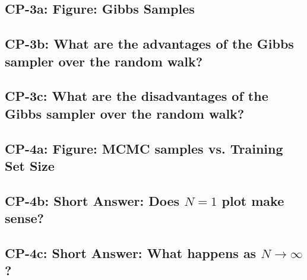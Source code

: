 \documentclass[10pt]{article}
\begin{document}
\newpage

\subsection{CP-3a: Figure: Gibbs Samples}

\subsection{CP-3b: What are the advantages of the Gibbs sampler over the random walk?}

\subsection{CP-3c: What are the disadvantages of the Gibbs sampler over the random walk?}

\newpage
\subsection{CP-4a: Figure: MCMC samples vs. Training Set Size}

\newpage
\subsection{CP-4b: Short Answer: Does $N=1$ plot make sense?}

\subsection{CP-4c: Short Answer: What happens as $N\rightarrow \infty$?}
\end{document}
